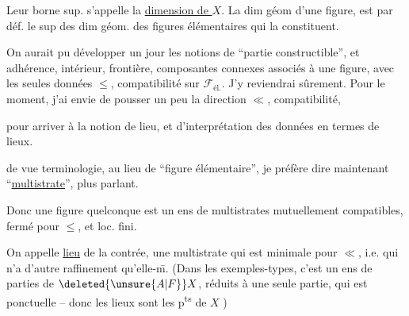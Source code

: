 Leur borne sup. s'appelle la \uline{dimension  de $X$}. La dim géom d'une figure, est par déf. le sup des dim géom. des  figures élémentaires qui la constituent.


On aurait pu développer un jour les notions de ``partie constructible'', et adhérence, intérieur, frontière, composantes connexes associés à une figure, avec les seules données $\leq$, compatibilité sur   $\mathcal{F}_{\text{él.}}$.
J'y reviendrai sûrement. Pour le moment, j'ai envie de pousser  un peu  la direction $\ll$, compatibilité,

pour arriver à la notion de lieu, et d'interprétation des données en termes de lieux.

 de vue terminologie, au lieu de ``figure élémentaire'', je préfère dire maintenant ``\uline{multistrate}'', plus parlant.

Donc une figure quelconque est un ens de multistrates mutuellement compatibles, fermé pour $\leq$, et loc. fini.

 On appelle  \uline{lieu} de la contrée, une multistrate qui est minimale pour $\ll$, i.e. qui n'a d'autre raffinement qu'elle-\={m}.     (Dans les exemples-types, c'est un ens de parties de $\deleted{\unsure{A|F}}X$, réduits à une seule partie, qui est ponctuelle -- donc les lieux sont les p\textsuperscript{ts} de $X$ )

